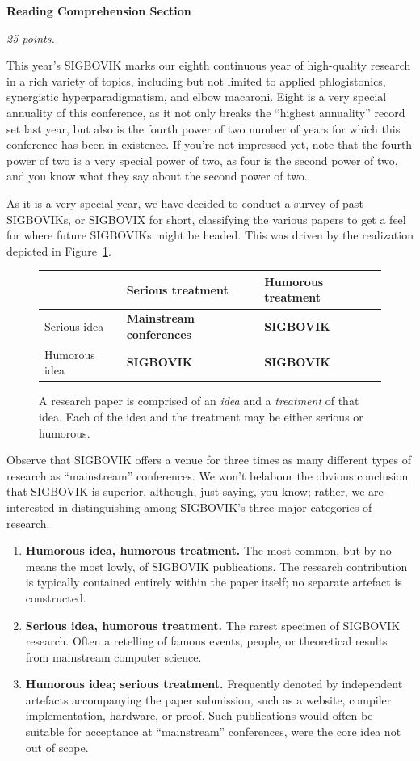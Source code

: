 \documentclass[12pt]{article}
\begin{document}
{\large \bf \sffamily Reading Comprehension Section}

{\em 25 points.}

This year's SIGBOVIK marks our eighth continuous year of high-quality research in a rich variety of topics, including but not limited to applied phlogistonics, synergistic hyperparadigmatism, and elbow macaroni. Eight is a very special annuality of this conference, as it not only breaks the ``highest annuality'' record set last year, but also is the fourth power of two number of years for which this conference has been in existence. If you're not impressed yet, note that the fourth power of two is a very special power of two, as four is the second power of two, and you know what they say about the second power of two.

As it is a very special year, we have decided to conduct a survey of past SIGBOVIKs, or SIGBOVIX for short, classifying the various papers to get a feel for where future SIGBOVIKs might be headed. This was driven by the realization depicted in Figure~\ref{fig:table}.

\begin{figure}[h]
\begin{center}
\begin{tabular}{p{5em}|p{5em}|p{5em}|}
& Serious treatment & Humorous treatment \\
\hline
Serious idea & \bf Mainstream conferences & \bf SIGBOVIK \\
\hline
Humorous idea & \bf SIGBOVIK & \bf SIGBOVIK \\
\hline

\end{tabular}
\end{center}
\caption{A research paper is comprised of an {\em idea} and a {\em treatment} of that idea. Each of the idea and the treatment may be either serious or humorous.}
\label{fig:table}
\end{figure}

Observe that SIGBOVIK offers a venue for three times as many different types of research as ``mainstream'' conferences. We won't belabour the obvious conclusion that SIGBOVIK is superior, although, just saying, you know; rather, we are interested in distinguishing among SIGBOVIK's three major categories of research.
\begin{enumerate}
\item {\bf Humorous idea, humorous treatment.} The most common, but by no means the most lowly, of SIGBOVIK publications. The research contribution is typically contained entirely within the paper itself; no separate artefact is constructed.
\item {\bf Serious idea, humorous treatment.} The rarest specimen of SIGBOVIK research. Often a retelling of famous events, people, or theoretical results from mainstream computer science.
\item {\bf Humorous idea; serious treatment.} Frequently denoted by independent artefacts accompanying the paper submission, such as a website, compiler implementation, hardware, or proof. Such publications would often be suitable for acceptance at ``mainstream'' conferences, were the core idea not out of scope.
\end{enumerate}
\end{document}
